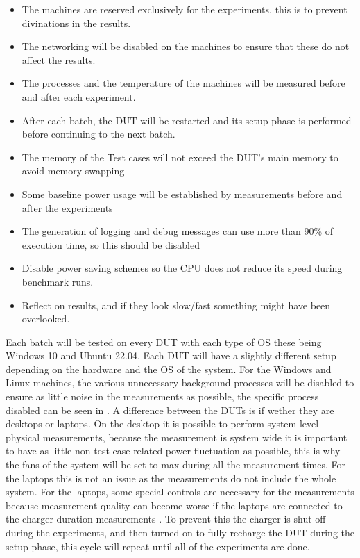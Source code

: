 \begin{itemize}
    \item The machines are reserved exclusively for the experiments, this is to prevent divinations in the results.
    \item The networking will be disabled on the machines to ensure that these do not affect the results.
    \item The processes and the temperature of the machines will be measured before and after each experiment.
    \item After each batch, the DUT will be restarted and its setup phase is performed before continuing to the next batch.
    \item The memory of the Test cases will not exceed the DUT's main memory to avoid memory swapping
    \item Some baseline power usage will be established by measurements before and after the experiments
    \item The generation of logging and debug messages can use more than 90\% of execution time, so this should be disabled
    \item Disable power saving schemes so the CPU does not reduce its speed during benchmark runs.
    \item Reflect on results, and if they look slow/fast something might have been overlooked.
\end{itemize}

Each batch will be tested on every DUT with each type of OS these being Windows 10 and Ubuntu 22.04. Each DUT will have a slightly different setup depending on the hardware and the OS of the system. For the Windows and Linux machines, the various unnecessary background processes will be disabled to ensure as little noise in the measurements as possible\cite*[]{sestoft2013microbenchmarks}, the specific process disabled can be seen in . A difference between the DUTs is if wether they are desktops or laptops. On the desktop it is possible to perform system-level physical measurements, because the measurement is system wide it is important to have as little non-test case related power fluctuation as possible, this is why the fans of the system will be set to max during all the measurement times. For the laptops this is not an issue as the measurements do not include the whole system. For the laptops, some special controls are necessary for the measurements because measurement quality can become worse if the laptops are connected to the charger duration measurements \cite{E3Video}. To prevent this the charger is shut off during the experiments, and then turned on to fully recharge the DUT during the setup phase, this cycle will repeat until all of the experiments are done.

